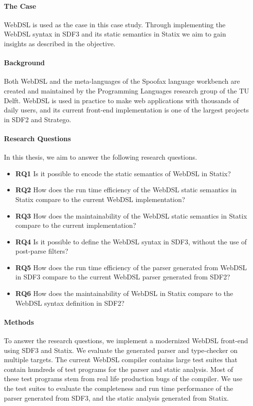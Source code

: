     \paragraph{The Case} WebDSL is used as the case in this case study. Through implementing the WebDSL syntax in SDF3 and its static semantics in Statix we aim to gain insights as described in the objective.

    \paragraph{Background} Both WebDSL and the meta-languages of the Spoofax language workbench are created and maintained by the Programming Languages research group of the TU Delft. WebDSL is used in practice to make web applications with thousands of daily users, and its current front-end implementation is one of the largest projects in SDF2 and Stratego.

    \paragraph{Research Questions} In this thesis, we aim to answer the following research questions.

    \begin{itemize}
      \item \textbf{RQ1} Is it possible to encode the static semantics of WebDSL in Statix?
      \item \textbf{RQ2} How does the run time efficiency of the WebDSL static semantics in Statix compare to the current WebDSL implementation?
      \item \textbf{RQ3} How does the maintainability of the WebDSL static semantics in Statix compare to the current implementation?
      \item \textbf{RQ4} Is it possible to define the WebDSL syntax in SDF3, without the use of post-parse filters?
      \item \textbf{RQ5} How does the run time efficiency of the parser generated from WebDSL in SDF3 compare to the current WebDSL parser generated from SDF2?
      \item \textbf{RQ6} How does the maintainability of WebDSL in Statix compare to the WebDSL syntax definition in SDF2?
    \end{itemize}

    \paragraph{Methods} To answer the research questions, we implement a modernized WebDSL front-end using SDF3 and Statix. We evaluate the generated parser and type-checker on multiple targets. The current WebDSL compiler contains large test suites that contain hundreds of test programs for the parser and static analysis. Most of these test programs stem from real life production bugs of the compiler. We use the test suites to evaluate the completeness and run time performance of the parser generated from SDF3, and the static analysis generated from Statix.


